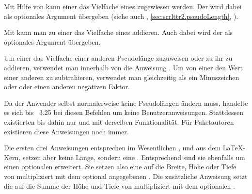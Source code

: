 \begin{Declaration}
\end{Declaration}
Mit Hilfe von
 kann einer  das Vielfache eines
 zugewiesen werden. Der  wird dabei als optionales
Argument übergeben (siehe auch ,
\autoref{sec:scrlttr2.pseudoLength},
).

Mit  kann man zu einer  das Vielfache
eines  addieren. Auch dabei wird der  als
optionales Argument übergeben.

Um einer  das Vielfache einer anderen Pseudolänge
zuzuweisen oder zu ihr zu addieren, verwendet man innerhalb von 
die Anweisung . Um von einer
 den Wert einer anderen  zu
subtrahieren, verwendet man gleichzeitig als  ein Minuszeichen
oder  oder einen anderen negativen Faktor.

%
%
Da der Anwender selbst normalerweise keine Pseudolängen ändern muss, handelte
es sich bis \KOMAScript~3.25 bei diesen Befehlen um keine
Benutzeranweisungen. Stattdessen existierten bis dahin nur
 und  mit derselben
Funktionalität. Für Paketautoren existieren diese Anweisungen noch immer.%
\EndIndexGroup


\begin{Declaration}
\end{Declaration}
Die ersten drei
Anweisungen entsprechen im Wesentlichen ,
 und  aus dem \LaTeX-Kern, setzen aber
keine Länge, sondern eine . Entsprechend
 sind sie ebenfalls um einen optionalen
 erweitert. Sie setzen also eine  auf die
Breite, Höhe oder Tiefe von  multipliziert mit dem optional
angegebenen . Die zusätzliche Anweisung
 setzt die  auf die Summe
der Höhe und Tiefe von  multipliziert mit dem optionalen
.%
\EndIndexGroup


